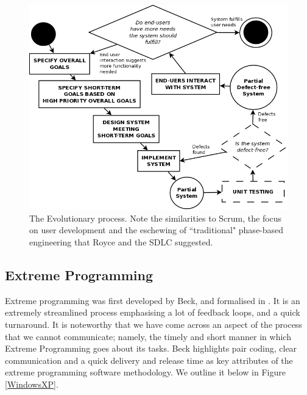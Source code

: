 \begin{figure}
\centering
\includegraphics[scale=0.4]{media/Evolution}
\caption{The Evolutionary process. Note the similarities to Scrum, the focus on
user development and the eschewing of ``traditional" phase-based engineering
  that Royce and the SDLC suggested.}
\label{Evolution}

\end{figure}

\subsection{Extreme Programming}
Extreme programming was first developed by Beck, and formalised in \cite{beck2004extreme}.
It is an extremely streamlined process emphasising a lot of feedback loops, and a quick turnaround.
It is noteworthy that we have come across an aspect of the process that we cannot communicate;
namely, the timely and short manner in which Extreme Programming goes about its tasks.
Beck highlights pair coding, clear communication and a quick delivery and release time as key
attributes of the extreme programming software methodology.
We outline it below in Figure \ref{WindowsXP}.

